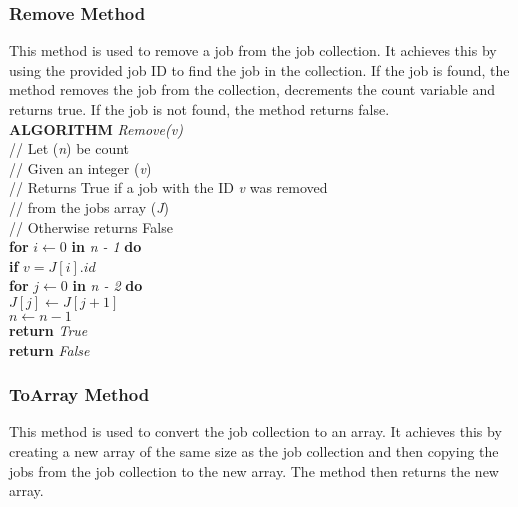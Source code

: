\documentclass[12pt,a4paper]{article}
\begin{document}
			\subsubsection{Remove Method}
				This method is used to remove a job from the job collection. It achieves this by using the 
				provided job ID to find the job in the collection. If the job is found, the method removes the 
				job from the collection, decrements the count variable and returns true. If the job is not found, 
				the method returns false.\\

				\textbf{ALGORITHM} \textit{Remove(v)}\\
				\null\hspace{1cm}// Let (\textit{n}) be count\\
				\null\hspace{1cm}// Given an integer (\textit{v})\\
				\null\hspace{1cm}// Returns True if a job with the ID \textit{v} was removed\\
				\null\hspace{1cm}// from the jobs array (\textit{J})\\
				\null\hspace{1cm}// Otherwise returns False\\
				\null\hspace{1cm}\textbf{for} \textit{$i \gets 0$} \textbf{in} \textit{n - 1} \textbf{do}\\
				\null\hspace{2cm}\textbf{if} \textit{$v = J[i].id$}\\
				\null\hspace{4cm}\textbf{for} \textit{$j \gets 0$} \textbf{in} \textit{n - 2} \textbf{do}\\
				\null\hspace{5cm}\textit{$J[j] \gets J[j + 1]$}\\
				\null\hspace{4cm}\textit{$n \gets n - 1$}\\
				\null\hspace{4cm}\textbf{return} \textit{True}\\
				\null\hspace{1cm}\textbf{return} \textit{False}\\
			
			\newpage
			
			\subsubsection{ToArray Method}
				This method is used to convert the job collection to an array. It achieves this by creating a 
				new array of the same size as the job collection and then copying the jobs from the job 
				collection to the new array. The method then returns the new array.\\
\end{document}
